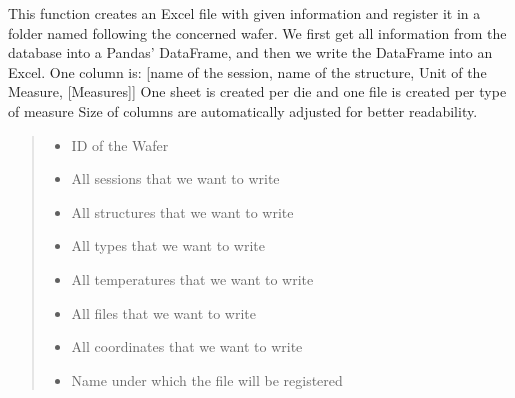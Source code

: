 \documentclass[letterpaper,10pt,english]{sphinxmanual}
\begin{document}
\begin{fulllineitems}
\label{\detokenize{excel:excel.wanted_excel}}
\pysigstartsignatures
{}
\pysigstopsignatures
\sphinxAtStartPar
This function creates an Excel file with given information and register it in a folder named following the concerned wafer.
We first get all information from the database into a Pandas’ DataFrame, and then we write the DataFrame into an Excel.
One column is: {[}name of the session, name of the structure, Unit of the Measure, {[}Measures{]}{]}
One sheet is created per die and one file is created per type of measure
Size of columns are automatically adjusted for better readability.
\begin{quote}\begin{description}
\begin{itemize}
\item {} 
\sphinxAtStartPar
{} \textendash{} ID of the Wafer

\item {} 
\sphinxAtStartPar
{} \textendash{} All sessions that we want to write

\item {} 
\sphinxAtStartPar
{} \textendash{} All structures that we want to write

\item {} 
\sphinxAtStartPar
{} \textendash{} All types that we want to write

\item {} 
\sphinxAtStartPar
{} \textendash{} All temperatures that we want to write

\item {} 
\sphinxAtStartPar
{} \textendash{} All files that we want to write

\item {} 
\sphinxAtStartPar
{} \textendash{} All coordinates that we want to write

\item {} 
\sphinxAtStartPar
{} \textendash{} Name under which the file will be registered

\end{itemize}

\end{description}\end{quote}

\end{fulllineitems}
\end{document}
